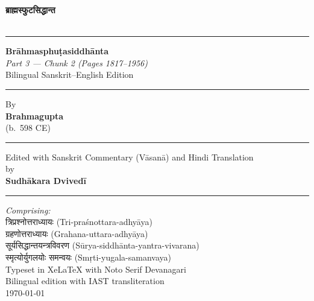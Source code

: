 \documentclass[11pt,a4paper]{article}
\newcommand{\dev}[1]{{\devanagarifont #1}}
\newcommand{\shortline}{\noindent\rule{0.5\textwidth}{0.4pt}\par}
\begin{document}
\thispagestyle{empty}
\begin{center}
\vspace*{2cm}

{\Huge\color{titlecolor}\bfseries\dev{ब्राह्मस्फुटसिद्धान्त}}\\[0.8cm]
{\LARGE\color{sectioncolor}\dev{भाग ३}}\\[1.5cm]

\shortline

{\Large\bfseries Brāhmasphuṭasiddhānta}\\[0.3cm]
{\large\itshape Part 3 --- Chunk 2 (Pages 1817--1956)}\\[0.5cm]
{\small Bilingual Sanskrit--English Edition}\\[1cm]

\shortline

{\large By}\\[0.3cm]
{\LARGE\bfseries Brahmagupta}\\[0.5cm]
{\large (b.~598 CE)}\\[1.5cm]

\shortline

{\large Edited with Sanskrit Commentary (Vāsanā) and Hindi Translation}\\[0.3cm]
{\large by}\\[0.3cm]
{\large\bfseries Sudhākara Dvivedī}\\[1cm]

\shortline

{\small\textit{Comprising:}}\\[0.2cm]
{\small\dev{त्रिप्रश्नोत्तराध्यायः} (Tri-pra\-{}śnottara-adhyāya)}\\[0.1cm]
{\small\dev{ग्रहणोत्तराध्यायः} (Grahana-uttara-adhyāya)}\\[0.1cm]
{\small\dev{सूर्यसिद्धान्तयन्त्रविवरण} (Sūrya-siddhānta-yantra-vivarana)}\\[0.1cm]
{\small\dev{स्मृत्योर्युगलयोः समन्वयः} (Smṛti-yugala-samanvaya)}\\[2cm]

\vfill
{\small Typeset in XeLaTeX with Noto Serif Devanagari}\\
{\small Bilingual edition with IAST transliteration}\\
{\small \today}
\end{center}
\newpage

\tableofcontents
\newpage
\end{document}
